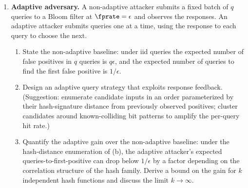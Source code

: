 \begin{enumerate}
\item \exstarstarstar
\label{ex:ch16-10}
\textbf{Adaptive adversary.}
A non-adaptive attacker submits a fixed batch of $q$ queries to
a Bloom filter at $\fprate = \epsilon$ and observes the responses.
An adaptive attacker submits queries one at a time, using the
response to each query to choose the next.
\begin{enumerate}
  \item[(a)] State the non-adaptive baseline: under iid queries
    the expected number of false positives in $q$ queries is
    $q \epsilon$, and the expected number of queries to find the
    first false positive is $1 / \epsilon$.
  \item[(b)] Design an adaptive query strategy that exploits
    response feedback. (Suggestion: enumerate candidate inputs
    in an order parameterized by their hash-signature distance
    from previously observed positives; cluster candidates around
    known-colliding bit patterns to amplify the per-query hit
    rate.)
  \item[(c)] Quantify the adaptive gain over the non-adaptive
    baseline: under the hash-distance enumeration of (b), the
    adaptive attacker's expected queries-to-first-positive can
    drop below $1 / \epsilon$ by a factor depending on the
    correlation structure of the hash family. Derive a bound on
    the gain for $k$ independent hash functions and discuss the
    limit $k \to \infty$.
\end{enumerate}


\end{enumerate}
